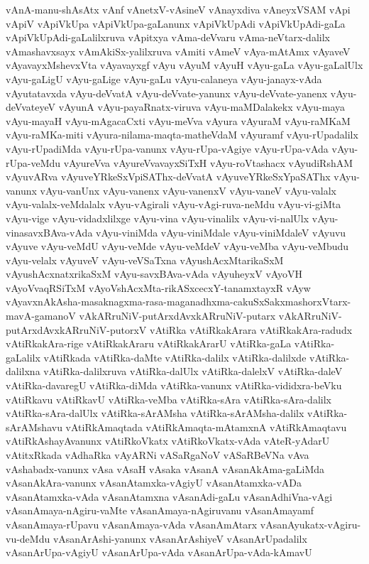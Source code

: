 {vAnA-manu-shAsAtx
vAnf
vAnetxV-vAsineV
vAnayxdiva
vAneyxVSAM
vApi
vApiV
vApiVkUpa
vApiVkUpa-gaLanunx
vApiVkUpAdi
vApiVkUpAdi-gaLa
vApiVkUpAdi-gaLalilxruva
vApitxya
vAma-deVvaru
vAma-neVtarx-dalilx
vAmashavxsayx
vAmAkiSx-yalilxruva
vAmiti
vAmeV
vAya-mAtAmx
vAyaveV
vAyavayxMshevxVta
vAyavayxgf
vAyu
vAyuM
vAyuH
vAyu-gaLa
vAyu-gaLalUlx
vAyu-gaLigU
vAyu-gaLige
vAyu-gaLu
vAyu-calaneya
vAyu-janayx-vAda
vAyutatavxda
vAyu-deVvatA
vAyu-deVvate-yanunx
vAyu-deVvate-yanenx
vAyu-deVvateyeV
vAyunA
vAyu-payaRnatx-viruva
vAyu-maMDalakekx
vAyu-maya
vAyu-mayaH
vAyu-mAgacaCxti
vAyu-meVva
vAyura
vAyuraM
vAyu-raMKaM
vAyu-raMKa-miti
vAyura-nilama-maqta-matheVdaM
vAyuramf
vAyu-rUpadalilx
vAyu-rUpadiMda
vAyu-rUpa-vanunx
vAyu-rUpa-vAgiye
vAyu-rUpa-vAda
vAyu-rUpa-veMdu
vAyureVva
vAyureVvavayxSiTxH
vAyu-roVtashacx
vAyudiRshAM
vAyuvARva
vAyuveYRkeSxVpiSAThx-deVvatA
vAyuveYRkeSxYpaSAThx
vAyu-vanunx
vAyu-vanUnx
vAyu-vanenx
vAyu-vanenxV
vAyu-vaneV
vAyu-valalx
vAyu-valalx-veMdalalx
vAyu-vAgirali
vAyu-vAgi-ruva-neMdu
vAyu-vi-giMta
vAyu-vige
vAyu-vidadxlilxge
vAyu-vina
vAyu-vinalilx
vAyu-vi-nalUlx
vAyu-vinasavxBAva-vAda
vAyu-viniMda
vAyu-viniMdale
vAyu-viniMdaleV
vAyuvu
vAyuve
vAyu-veMdU
vAyu-veMde
vAyu-veMdeV
vAyu-veMba
vAyu-veMbudu
vAyu-velalx
vAyuveV
vAyu-veVSaTxna
vAyushAcxMtarikaSxM
vAyushAcxnatxrikaSxM
vAyu-savxBAva-vAda
vAyuheyxV
vAyoVH
vAyoVvaqRSiTxM
vAyoVshAcxMta-rikASxcecxY-tanamxtayxR
vAyw
vAyavxnAkAsha-masaknagxma-rasa-maganadhxma-cakuSxSakxmashorxVtarx-mavA-gamanoV
vAkARruNiV-putArxdAvxkARruNiV-putarx
vAkARruNiV-putArxdAvxkARruNiV-putorxV
vAtiRka
vAtiRkakArara
vAtiRkakAra-radudx
vAtiRkakAra-rige
vAtiRkakAraru
vAtiRkakArarU
vAtiRka-gaLa
vAtiRka-gaLalilx
vAtiRkada
vAtiRka-daMte
vAtiRka-dalilx
vAtiRka-dalilxde
vAtiRka-dalilxna
vAtiRka-dalilxruva
vAtiRka-dalUlx
vAtiRka-dalelxV
vAtiRka-daleV
vAtiRka-davaregU
vAtiRka-diMda
vAtiRka-vanunx
vAtiRka-vididxra-beVku
vAtiRkavu
vAtiRkavU
vAtiRka-veMba
vAtiRka-sAra
vAtiRka-sAra-dalilx
vAtiRka-sAra-dalUlx
vAtiRka-sArAMsha
vAtiRka-sArAMsha-dalilx
vAtiRka-sArAMshavu
vAtiRkAmaqtada
vAtiRkAmaqta-mAtamxnA
vAtiRkAmaqtavu
vAtiRkAshayAvanunx
vAtiRkoVkatx
vAtiRkoVkatx-vAda
vAteR-yAdarU
vAtitxRkada
vAdhaRka
vAyARNi
vASaRgaNoV
vASaRBeVNa
vAva
vAshabadx-vanunx
vAsa
vAsaH
vAsaka
vAsanA
vAsanAkAma-gaLiMda
vAsanAkAra-vanunx
vAsanAtamxka-vAgiyU
vAsanAtamxka-vADa
vAsanAtamxka-vAda
vAsanAtamxna
vAsanAdi-gaLu
vAsanAdhiVna-vAgi
vAsanAmaya-nAgiru-vaMte
vAsanAmaya-nAgiruvanu
vAsanAmayamf
vAsanAmaya-rUpavu
vAsanAmaya-vAda
vAsanAmAtarx
vAsanAyukatx-vAgiru-vu-deMdu
vAsanArAshi-yanunx
vAsanArAshiyeV
vAsanArUpadalilx
vAsanArUpa-vAgiyU
vAsanArUpa-vAda
vAsanArUpa-vAda-kAmavU
}
